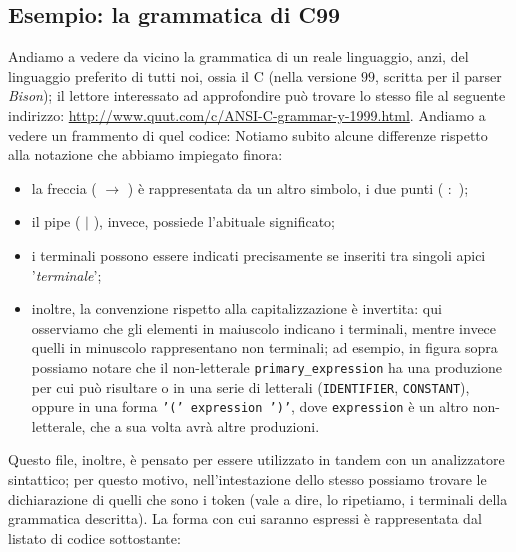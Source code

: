 \documentclass[class=book, crop=false, oneside, 12pt]{standalone}
\begin{document}
\subsection{Esempio: la grammatica di C99}
Andiamo a vedere da vicino la grammatica di un reale linguaggio, anzi, del linguaggio preferito di tutti noi, ossia il C (nella versione \(99\), scritta per il parser \emph{Bison}); il lettore interessato ad approfondire può trovare lo stesso file al seguente indirizzo: \url{http://www.quut.com/c/ANSI-C-grammar-y-1999.html}. Andiamo a vedere un frammento di quel codice:
Notiamo subito alcune differenze rispetto alla notazione che abbiamo impiegato finora: 
\begin{itemize}
    \item la freccia ( \(\to\) ) è rappresentata da un altro simbolo, i due punti ( \(:\) );
    \item il pipe ( \(\mid\) ), invece, possiede l'abituale significato;
    \item i terminali possono essere indicati precisamente se inseriti tra singoli apici '\emph{terminale}';
    \item inoltre, la convenzione rispetto alla capitalizzazione è invertita: qui osserviamo che gli elementi in maiuscolo indicano i terminali, mentre invece quelli in minuscolo rappresentano non terminali; ad esempio, in figura sopra possiamo notare che il non-letterale \texttt{primary\_expression} ha una produzione per cui può risultare o in una serie di letterali (\texttt{IDENTIFIER}, \texttt{CONSTANT}), oppure in una forma \texttt{'(' expression ')'}, dove \texttt{expression} è un altro non-letterale, che a sua volta avrà altre produzioni.
\end{itemize}

Questo file, inoltre, è pensato per essere utilizzato in tandem con un analizzatore sintattico; per questo motivo, nell'intestazione dello stesso possiamo trovare le dichiarazione di quelli che sono i token (vale a dire, lo ripetiamo, i terminali della grammatica descritta). La forma con cui saranno espressi è rappresentata dal listato di codice sottostante:
\end{document}
